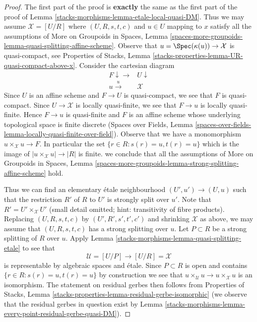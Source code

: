 \begin{proof}
The first part of the proof is {\bf exactly} the same as the first part
of the proof of Lemma \ref{stacks-morphisms-lemma-etale-local-quasi-DM}.
Thus we may assume $\mathcal{X} = [U/R]$ where $(U, R, s, t, c)$
and $u \in U$ mapping to $x$ satisfy all the assumptions of
More on Groupoids in Spaces, Lemma
\ref{spaces-more-groupoids-lemma-quasi-splitting-affine-scheme}.
Observe that $u = \Spec(\kappa(u)) \to \mathcal{X}$ is quasi-compact, see
Properties of Stacks, Lemma
\ref{stacks-properties-lemma-UR-quasi-compact-above-x}.
Consider the cartesian diagram
$$
\begin{array}{cc}F \downarrow\longrightarrow & U \downarrow \\ u \overset{u}{\longrightarrow} & \mathcal{X}\end{array}
$$
Since $U$ is an affine scheme and $F \to U$ is quasi-compact,
we see that $F$ is quasi-compact. Since $U \to \mathcal{X}$
is locally quasi-finite, we see that $F \to u$ is
locally quasi-finite. Hence $F \to u$ is quasi-finite
and $F$ is an affine scheme whose underlying topological
space is finite discrete (Spaces over Fields, Lemma
\ref{spaces-over-fields-lemma-locally-quasi-finite-over-field}).
Observe that we have a monomorphism $u \times_\mathcal{X} u \to F$.
In particular the set $\{r \in R : s(r) = u, t(r) = u\}$
which is the image of $|u \times_\mathcal{X} u| \to |R|$
is finite. we conclude that all the assumptions of
More on Groupoids in Spaces, Lemma
\ref{spaces-more-groupoids-lemma-strong-splitting-affine-scheme}
hold.

\medskip\noindent
Thus we can find an elementary \'etale neighbourhood
$(U', u') \to (U, u)$ such that the restriction $R'$ of $R$ to $U'$
is strongly split over $u'$. Note that $R' = U' \times_\mathcal{X} U'$
(small detail omitted; hint: transitivity of fibre products).
Replacing $(U, R, s, t, c)$ by $(U', R', s', t', c')$ and shrinking
$\mathcal{X}$ as above, we may assume that $(U, R, s, t, c)$ has
a strong splitting over $u$. Let $P \subset R$ be a strong splitting
of $R$ over $u$. Apply Lemma \ref{stacks-morphisms-lemma-quasi-splitting-etale} to see that
$$
\mathcal{U} = [U/P] \longrightarrow [U/R] = \mathcal{X}
$$
is representable by algebraic spaces and \'etale. Since $P \subset R$
is open and contains $\{r \in R : s(r) = u, t(r) = u\}$ by construction
we see that
$u \times_\mathcal{U} u \to u \times_\mathcal{X} u$ is an isomorphism.
The statement on residual gerbes then follows from
Properties of Stacks, Lemma
\ref{stacks-properties-lemma-residual-gerbe-isomorphic}
(we observe that the residual gerbes in question exist by
Lemma \ref{stacks-morphisms-lemma-every-point-residual-gerbe-quasi-DM}).
\end{proof}

